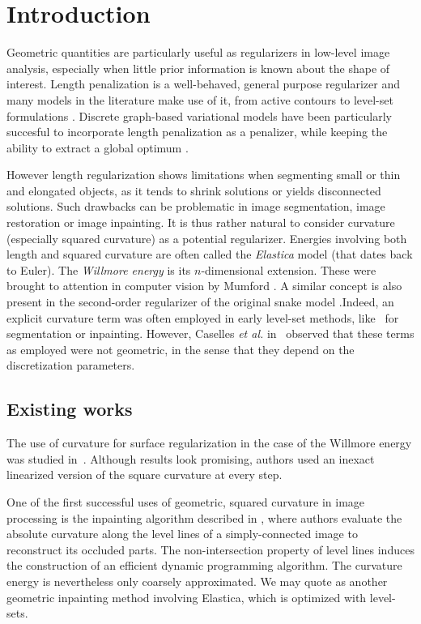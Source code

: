 \documentclass[smallextended]{svjour3}       %
\newcommand{\todo}[1]{{\textcolor{blue}{#1}}}
\begin{document}
\section{Introduction} %

Geometric quantities are particularly useful as regularizers in
low-level image analysis, especially when little prior information is
known about the shape of interest. Length penalization is a
well-behaved, general purpose regularizer and many models in the
literature make use of it, from active contours
\cite{caseles97geodesic} to level-set formulations
\cite{malladi1995image,malladi1995shape}. Discrete graph-based
variational models have been particularly succesful to incorporate
length penalization as a penalizer, while keeping the ability to
extract a global optimum \cite{boykov01graphcut,appleton05geodesic}.

However length regularization shows limitations when segmenting small
or thin and elongated objects, as it tends to shrink solutions or
yields disconnected solutions. Such drawbacks can be problematic in
image segmentation, image restoration or image inpainting. It is thus
rather natural to consider curvature (especially squared curvature) as
a potential regularizer. Energies involving both length and squared
curvature are often called the {\em Elastica} model (that dates back
to Euler). The {\em Willmore energy} is its $n$-dimensional
extension. These were brought to attention in computer vision by
Mumford \cite{mumford1994elastica}. A similar concept is also present
in the second-order regularizer of the original snake model
\cite{kass1988snakes}.Indeed, an explicit curvature term was often
employed in early level-set methods,
like~\cite{malladi1995image,malladi1995shape,ballester01filljoint} for
segmentation or inpainting. However, Caselles {\em et al.}
in~\cite{caseles97geodesic} observed that these terms as employed
were not geometric, in the sense that they depend on the
discretization parameters.

\subsection{Existing works}
The use of curvature for surface regularization in the case of the
Willmore energy was studied in~\cite{bobenko2005discrete}. Although
results look promising, authors used an inexact linearized version of
the square curvature at every step.

One of the first successful uses of geometric, squared curvature in
image processing is the inpainting algorithm described in
\cite{masnou98inpainting}, where authors evaluate the absolute
curvature along the level lines of a simply-connected image to
reconstruct its occluded parts. The non-intersection property of level
lines induces the construction of an efficient dynamic programming
algorithm. The curvature energy is nevertheless only coarsely
approximated. We may quote \cite{chan02elasticainpainting} as another
geometric inpainting method involving Elastica, which is optimized with
level-sets.
\end{document}
